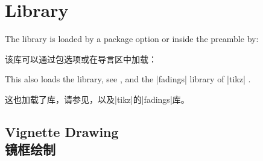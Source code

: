 \clearpage
\section{Library }\label{sec:vignette}%
%
The library is loaded by a package option or inside the preamble by:

该库可以通过包选项或在导言区中加载：
\begin{dispListing}
\end{dispListing}
This also loads the  library, see ,
and the |fadings| library of |tikz| .

这也加载了库，请参见，以及|tikz|的|fadings|库。
\subsection{Vignette Drawing\\镜框绘制}\label{subsec:vignettedrawing}

